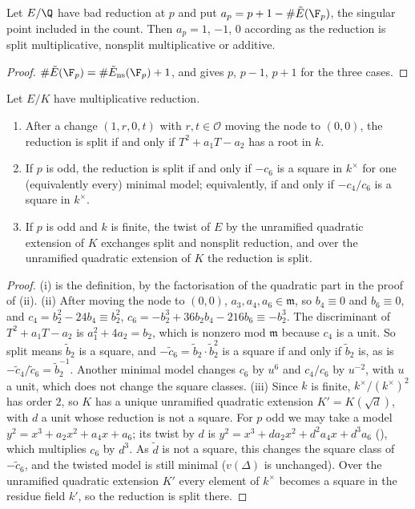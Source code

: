 \begin{corollary}\label{cor:reduction:ap-bad}
Let $E/\Q$ have bad reduction at $p$ and put $a_p=p+1-\#\tilde E(\F_p)$, the singular point included in the
count. Then $a_p=1$, $-1$, $0$ according as the reduction is split multiplicative, nonsplit multiplicative or
additive.
\end{corollary}

\begin{proof}
$\#\tilde E(\F_p)=\#\tilde E_{\mathrm{ns}}(\F_p)+1$, and  gives $p$, $p-1$, $p+1$ for the three
cases.
\end{proof}

\begin{proposition}\label{prop:reduction:split}
Let $E/K$ have multiplicative reduction.
\begin{enumerate}[label=(\roman*)]
\item After a change $(1,r,0,t)$ with $r,t\in\mathcal O$ moving the node to $(0,0)$, the reduction is split if and
only if $T^2+a_1T-a_2$ has a root in $k$.
\item If $p$ is odd, the reduction is split if and only if $-c_6$ is a square in $k^\times$ for one (equivalently
every) minimal model; equivalently, if and only if $-c_4/c_6$ is a square in $k^\times$.
\item If $p$ is odd and $k$ is finite, the twist of $E$ by the unramified quadratic extension of $K$ exchanges split and
nonsplit reduction, and over the unramified quadratic extension of $K$ the reduction is split.
\end{enumerate}
\end{proposition}

\begin{proof}
(i) is the definition, by the factorisation of the quadratic part in the proof of (ii).
(ii) After moving the node to $(0,0)$, $a_3,a_4,a_6\in\mathfrak m$, so $b_4\equiv0$ and $b_6\equiv0$, and
$c_4=b_2^2-24b_4\equiv b_2^2$, $c_6=-b_2^3+36b_2b_4-216b_6\equiv-b_2^3$. The discriminant of $T^2+a_1T-a_2$ is
$a_1^2+4a_2=b_2$, which is nonzero mod $\mathfrak m$ because $c_4$ is a unit. So split means $\tilde b_2$ is a
square, and $-\tilde c_6=\tilde b_2\cdot\tilde b_2^2$ is a square if and only if $\tilde b_2$ is, as is
$-\tilde c_4/\tilde c_6=\tilde b_2^{-1}$. Another minimal model changes $c_6$ by $u^6$ and $c_4/c_6$ by $u^{-2}$, with
$u$ a unit, which does not change the square classes.
(iii) Since $k$ is finite, $k^\times/(k^\times)^2$ has order $2$, so $K$ has a unique unramified quadratic extension
$K'=K(\sqrt d)$, with $d$ a unit whose reduction is not a square. For $p$ odd we may take a model $y^2=x^3+a_2x^2+a_4x+a_6$; its twist by $d$ is
$y^2=x^3+da_2x^2+d^2a_4x+d^3a_6$ (), which multiplies $c_6$ by $d^3$. As $\tilde d$ is not a square, this changes the square class of $-\tilde c_6$, and the twisted model is still
minimal ($v(\Delta)$ is unchanged). Over the unramified quadratic extension $K'$ every element of $k^\times$
becomes a square in the residue field $k'$, so the reduction is split there.
\end{proof}

